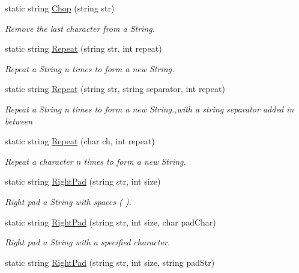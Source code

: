 \begin{DoxyCompactItemize}
static string \hyperlink{class_ultimate_1_1_utilities_1_1_string_utils_ae376d26c5c6ef25a121fab8a7efcae6b}{Chop} (string str)
\begin{DoxyCompactList}\small\item\em Remove the last character from a String. \end{DoxyCompactList}\item 
static string \hyperlink{class_ultimate_1_1_utilities_1_1_string_utils_a12ce1635b9779747f8fdefa5bbda155b}{Repeat} (string str, int repeat)
\begin{DoxyCompactList}\small\item\em Repeat a String n times to form a new String. \end{DoxyCompactList}\item 
static string \hyperlink{class_ultimate_1_1_utilities_1_1_string_utils_ac4a8216c1a4dc11a7d3815bffb427629}{Repeat} (string str, string separator, int repeat)
\begin{DoxyCompactList}\small\item\em Repeat a String n times to form a new String.,with a string separator added in between \end{DoxyCompactList}\item 
static string \hyperlink{class_ultimate_1_1_utilities_1_1_string_utils_a3aa500ba10f8dbce4a55cfd20349b7ce}{Repeat} (char ch, int repeat)
\begin{DoxyCompactList}\small\item\em Repeat a character n times to form a new String. \end{DoxyCompactList}\item 
static string \hyperlink{class_ultimate_1_1_utilities_1_1_string_utils_a53ffef3b3e5b17b2b6e0801953a2f366}{Right\+Pad} (string str, int size)
\begin{DoxyCompactList}\small\item\em Right pad a String with spaces (\textquotesingle{} \textquotesingle{}). \end{DoxyCompactList}\item 
static string \hyperlink{class_ultimate_1_1_utilities_1_1_string_utils_a8cc57c9a844d5782037bf5d1844dc333}{Right\+Pad} (string str, int size, char pad\+Char)
\begin{DoxyCompactList}\small\item\em Right pad a String with a specified character. \end{DoxyCompactList}\item 
static string \hyperlink{class_ultimate_1_1_utilities_1_1_string_utils_a9143513dadc6498bafb8f768d9b3da73}{Right\+Pad} (string str, int size, string pad\+Str)

\end{DoxyCompactItemize}
